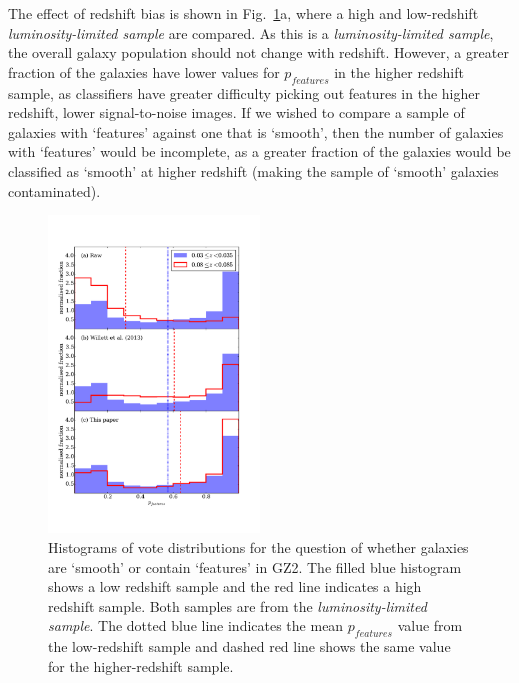 \documentclass[useAMS,usenatbib]{mn2e}
\begin{document}
The effect of redshift bias is shown in Fig.~\ref{fig:vote_histograms}a, where a high and low-redshift \textit{luminosity-limited sample} are compared. As this is a \textit{luminosity-limited sample}, the overall galaxy population should not change with redshift. However, a greater fraction of the galaxies have lower values for $p_{features}$ in the higher redshift sample, as classifiers have greater difficulty picking out features in the higher redshift, lower signal-to-noise images. If we wished to compare a sample of galaxies with `features' against one that is `smooth', then the number of galaxies with `features' would be incomplete, as a greater fraction of the galaxies would be classified as `smooth' at higher redshift (making the sample of `smooth' galaxies contaminated).

\begin{figure}
		\centering

        \includegraphics[width=0.5\textwidth]{Images/Bias/Biases/comparison_histogram.pdf}

        \caption{Histograms of vote distributions for the question of whether galaxies are `smooth' or contain `features' in GZ2. The filled blue histogram shows a low redshift sample and the red line indicates a high redshift sample. Both samples are from the \textit{luminosity-limited sample}. The dotted blue line indicates the mean $p_{features}$ value from the low-redshift sample and dashed red line shows the same value for the higher-redshift sample.}

        \label{fig:vote_histograms}

\end{figure}
\end{document}
